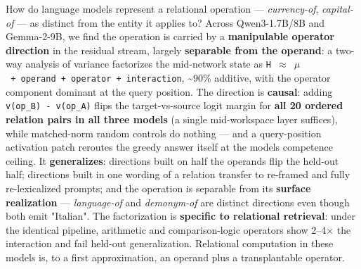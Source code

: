 How do language models represent a relational operation ---
\emph{currency-of}, \emph{capital-of} --- as distinct from the entity it
applies to? Across Qwen3-1.7B/8B and Gemma-2-9B, we find the operation
is carried by a \textbf{manipulable operator direction} in the residual
stream, largely \textbf{separable from the operand}: a two-way analysis
of variance factorizes the mid-network state as
\texttt{H\ \ensuremath{\approx}\ \ensuremath{\mu}\ +\ operand\ +\ operator\ +\ interaction},
\textasciitilde90\% additive, with the operator component dominant at
the query position. The direction is \textbf{causal}: adding
\texttt{v(op\_B)\ -\ v(op\_A)} flips the target-vs-source logit margin
for \textbf{all 20 ordered relation pairs in all three models} (a single
mid-workspace layer suffices), while matched-norm random controls do
nothing --- and a query-position activation patch reroutes the greedy
answer itself at the model\textquotesingle s competence ceiling. It
\textbf{generalizes}: directions built on half the operands flip the
held-out half; directions built in one wording of a relation transfer to
re-framed and fully re-lexicalized prompts; and the operation is
separable from its \textbf{surface realization} --- \emph{language-of}
and \emph{demonym-of} are distinct directions even though both emit
"Italian". The factorization is \textbf{specific to relational
retrieval}: under the identical pipeline, arithmetic and
comparison-logic operators show 2--4\ensuremath{\times} the interaction and fail held-out
generalization. Relational computation in these models is, to a first
approximation, an operand plus a transplantable operator.
